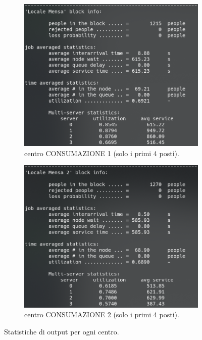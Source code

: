 \documentclass{article}
\begin{document}
\begin{figure}[H]
\begin{subfigure}{.5\textwidth}
  \centering
  \includegraphics[width=.9\linewidth]{img/migliorativo_2_2/consumazione_1.png}
  \caption{centro CONSUMAZIONE 1 (solo i primi 4 posti).}
  \label{fig:consumazione_1_ext_2_pol_2}
\end{subfigure}
\begin{subfigure}{.5\textwidth}
  \centering
  \includegraphics[width=.9\linewidth]{img/migliorativo_2_2/consumazione_2.png}
  \caption{centro CONSUMAZIONE 2 (solo i primi 4 posti).}
  \label{fig:consumazione_1_ext_2_pol_2}
\end{subfigure}
\caption{Statistiche di output per ogni centro.}
\label{fig:output_ext_2_pol_2_consumazioni}
\end{figure}
\FloatBarrier
\end{document}
